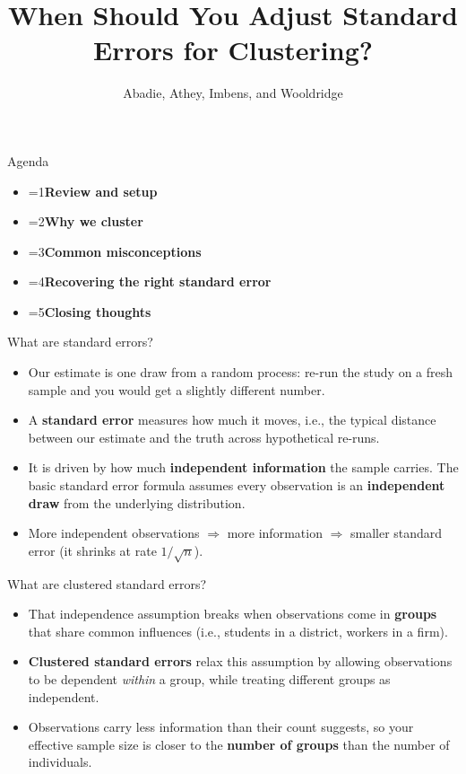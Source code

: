 \documentclass[11pt,aspectratio=169]{beamer}
\title{When Should You Adjust Standard Errors for Clustering?}
\subtitle{Abadie, Athey, Imbens, and Wooldridge}
\author{}
\date{}
\newcommand{\bx}[1]{\textbf{#1}}
\newcounter{agcur}
\newcommand{\agitem}[2]{\item {\ifnum\value{agcur}=#1\bfseries\fi #2}}
\newcommand{\agenda}[1]{%
  \setcounter{agcur}{#1}%
  \begin{frame}{Agenda}
    \vspace{0.6em}
    \large
    \begin{itemize}\setlength{\itemsep}{11pt}
      \agitem{1}{Review and setup}
      \agitem{2}{Why we cluster}
      \agitem{3}{Common misconceptions}
      \agitem{4}{Recovering the right standard error}
      \agitem{5}{Closing thoughts}
    \end{itemize}
  \end{frame}}
\begin{document}
\begin{frame}[plain]
  \titlepage
\end{frame}

\agenda{1}

\begin{frame}{What are standard errors?}
\begin{itemize}\setlength{\itemsep}{11pt}
  \item Our estimate is one draw from a random process: re-run the study on a fresh sample and you would get a
        slightly different number.
  \item A \bx{standard error} measures how much it moves, i.e., the typical distance between our estimate and the
        truth across hypothetical re-runs.
  \item It is driven by how much \bx{independent information} the sample carries. The basic standard error formula
        assumes every observation is an \bx{independent draw} from the underlying distribution. 
  \item More independent observations $\Rightarrow$ more information $\Rightarrow$ smaller standard error
        (it shrinks at rate $1/\sqrt{n}$).
\end{itemize}
\end{frame}

\begin{frame}{What are clustered standard errors?}
\begin{itemize}\setlength{\itemsep}{13pt}
  \item That independence assumption breaks when observations come in \bx{groups} that share common influences (i.e., students in a district,
        workers in a firm).
  \item \bx{Clustered standard errors} relax this assumption by allowing observations to be dependent \emph{within} a group,
        while treating different groups as independent.
  \item Observations carry less information than their count suggests, so your effective
        sample size is closer to the \bx{number of groups} than the number of individuals.
\end{itemize}
\end{frame}
\end{document}

